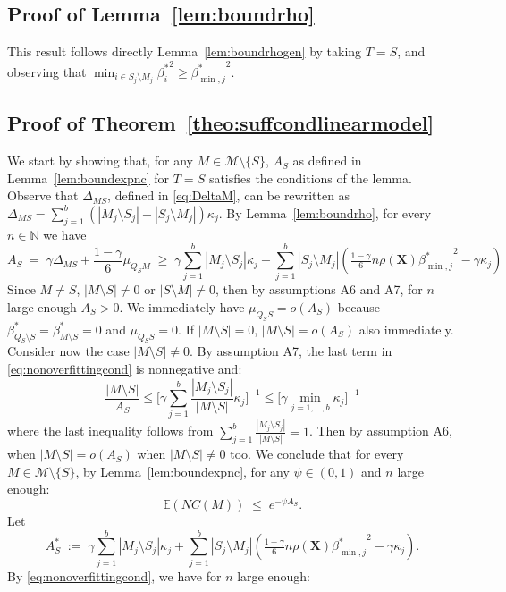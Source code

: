 \documentclass[aos]{imsart}
\theoremstyle{plain}
\newcommand{\E}{\mathbb{E}}
\newcommand{\N}{\mathbb{N}}
\newcommand{\bs}{\boldsymbol}
\begin{document}
\subsection{Proof of Lemma~\ref{lem:boundrho}}
This result follows directly Lemma~\ref{lem:boundrhogen} by taking $T=S$, and observing that $\min_{i\in S_j\setminus M_j}{\beta^*_i}^2\geq {\beta^*_{\min,j}}^2$.

\subsection{Proof of Theorem~\ref{theo:suffcondlinearmodel}} We start by showing that, for any $M\in\mathcal{M}\setminus \{S\}$, $A_S$ as defined in Lemma~\ref{lem:boundexpnc} for $T=S$ satisfies the conditions of the lemma. Observe that $\Delta_{MS}$, defined in \eqref{eq:DeltaM}, can be rewritten as $\Delta_{MS}=\sum_{j=1}^b(|M_j\setminus S_j|-|S_j\setminus M_j|)\kappa_j$. By  Lemma~\ref{lem:boundrho}, for every $n\in \N$ we have 
\begin{equation}\label{eq:nonoverfittingcond}
   A_S\;=\; \gamma \Delta_{MS}+\frac{1-\gamma}{6}\mu_{Q_SM}\;\geq\; \gamma\sum_{j=1}^b|M_j \setminus S_j|\kappa_j + \sum_{j=1}^b |S_j\setminus M_j |\left(\tfrac{1-\gamma}{6} n \rho(\bs X) {\beta^*_{\min,j}}^{2} - \gamma\kappa_j\right) 
\end{equation} 
Since $M\neq S$, $|M\setminus S|\neq0$ or $|S\setminus M|\neq0$, then by assumptions A6 and A7, for $n$ large enough $A_S>0$. We immediately have $\mu_{Q_S S}=o(A_S)$ because $\beta^*_{Q_S\setminus S}=\beta^*_{M\setminus S}=0$ and $\mu_{Q_S S}=0$. If $|M\setminus S|=0$, $|M\setminus S|=o(A_S)$ also immediately. Consider now the case $|M\setminus S|\neq 0$. By assumption A7, the last term in \eqref{eq:nonoverfittingcond} is nonnegative and:
$$\frac{|M\setminus S|}{A_S}\leq \bigg[ \gamma\sum_{j=1}^b\frac{|M_j \setminus S_j|}{|M\setminus S|}\kappa_j \bigg]^{-1} \leq \Big[ \gamma\min_{j=1,\ldots,b}\kappa_j \Big]^{-1} $$
where the last inequality follows from $\sum_{j=1}^b\frac{|M_j \setminus S_j|}{|M\setminus S|}=1$. Then by assumption A6, when $|M\setminus S|=o(A_S)$ when $|M\setminus S|\neq 0$ too.
We conclude that for every $M\in \mathcal M\setminus \{S\}$, by Lemma~\ref{lem:boundexpnc}, for any $\psi\in(0,1)$ and $n$ large enough:
$$
\E(NC(M))\;\leq\;e^{-\psi A_S}.
$$
Let 
$$A_S^*\;:=\;\gamma\sum_{j=1}^b|M_j \setminus S_j|\kappa_j + \sum_{j=1}^b |S_j\setminus M_j |\left(\tfrac{1-\gamma}{6} n \rho(\bs X) {\beta^*_{\min,j}}^{2} - \gamma\kappa_j\right).$$
By \eqref{eq:nonoverfittingcond}, we have for $n$ large enough:
\end{document}
